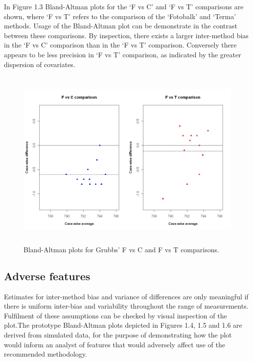 \documentclass[Main.tex]{subfiles}
\begin{document}
	
	
	In Figure 1.3 Bland-Altman plots for the `F vs C' and `F vs T'
	comparisons are shown, where `F vs T' refers to the comparison of
	the `Fotobalk' and `Terma' methods. Usage of the Bland-Altman plot
	can be demonstrate in the contrast between these comparisons. By inspection, there exists a larger inter-method bias in the `F vs C' comparison than in the `F vs T' comparison. Conversely there
	appears to be less precision in `F vs T' comparison, as indicated
	by the greater dispersion of covariates.
	
	\begin{figure}[h!]
		\begin{center}
			\includegraphics[height=90mm]{images/GrubbsDataTwoBAplots.jpeg}
			\caption{Bland-Altman plots for Grubbs' F vs C and F vs T comparisons.}\label{GrubbsDataTwoBAplots}
		\end{center}
	\end{figure}
	
	\subsection{Adverse features}
	
	Estimates for inter-method bias and variance of differences are only meaningful if there is uniform inter-bias and variability throughout the range of measurements. Fulfilment of these assumptions can be checked by visual inspection of the plot.The prototype Bland-Altman plots depicted in Figures 1.4, 1.5 and 1.6 are derived from simulated data, for the purpose of demonstrating how the plot would inform an analyst of features that would adversely affect use of the recommended methodology.
	
\end{document}
